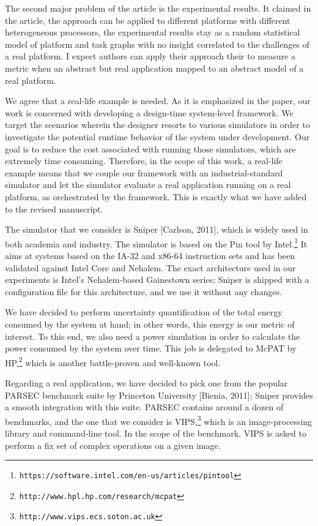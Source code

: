 \begin{reviewer}
The second major problem of the article is the experimental results. It claimed
in the article, the approach can be applied to different platforms with
different heterogeneous processors, the experimental results stay as a random
statistical model of platform and task graphs with no insight correlated to the
challenges of a real platform. I expect authors can apply their approach their
to measure a metric when an abstract but real application mapped to an abstract
model of a real platform.
\end{reviewer}

\begin{authors}
We agree that a real-life example is needed. As it is emphasized in the paper,
our work is concerned with developing a design-time system-level framework. We
target the scenarios wherein the designer resorts to various simulators in order
to investigate the potential runtime behavior of the system under development.
Our goal is to reduce the cost associated with running those simulators, which
are extremely time consuming. Therefore, in the scope of this work, a real-life
example means that we couple our framework with an industrial-standard simulator
and let the simulator evaluate a real application running on a real platform, as
orchestrated by the framework. This is exactly what we have added to the revised
manuscript.

The simulator that we consider is Sniper [Carlson, 2011], which is widely used
in both academia and industry. The simulator is based on the Pin tool by
Intel.\footnote{\texttt{https://software.intel.com/en-us/articles/pintool}} It
aims at systems based on the IA-32 and x86-64 instruction sets and has been
validated against Intel Core and Nehalem. The exact architecture used in our
experiments is Intel's Nehalem-based Gainestown series; Sniper is shipped with a
configuration file for this architecture, and we use it without any changes.

We have decided to perform uncertainty quantification of the total energy
consumed by the system at hand; in other words, this energy is our metric of
interest. To this end, we also need a power simulation in order to calculate the
power consumed by the system over time. This job is delegated to McPAT by
HP,\footnote{\texttt{http://www.hpl.hp.com/research/mcpat}} which is another
battle-proven and well-known tool.

Regarding a real application, we have decided to pick one from the popular
PARSEC benchmark suite by Princeton University [Bienia, 2011]; Sniper provides a
smooth integration with this suite. PARSEC contains around a dozen of
benchmarks, and the one that we consider is
VIPS,\footnote{\texttt{http://www.vips.ecs.soton.ac.uk}} which is an
image-processing library and command-line tool. In the scope of the benchmark,
VIPS is asked to perform a fix set of complex operations on a given image.


\end{authors}
